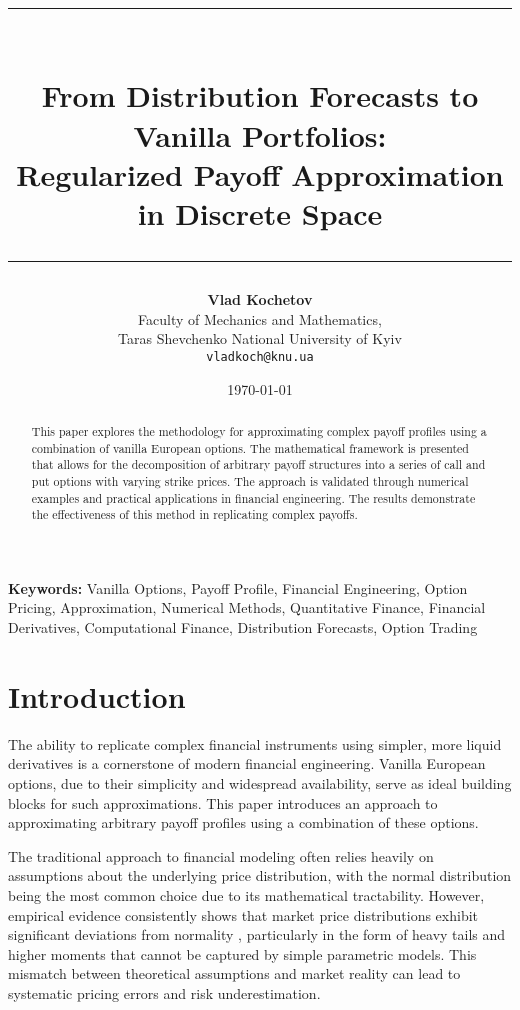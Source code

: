 \documentclass[12pt]{article}
\title{\rule{\textwidth}{4pt}\\[1em]
\textbf{From Distribution Forecasts to Vanilla Portfolios: \\[0.2cm]
Regularized Payoff Approximation in Discrete Space}\\[1em]
\rule{\textwidth}{2pt}}
\author{\small \textbf{Vlad Kochetov} \\
    \small Faculty of Mechanics and Mathematics, \\
    \small Taras Shevchenko National University of Kyiv \\
    \small \texttt{vladkoch@knu.ua}
}
\date{\today}
\providecommand{\keywords}[1]{\textbf{Keywords:} #1}
\begin{document}
\thispagestyle{empty}

\maketitle

\begin{abstract}
This paper explores the methodology for approximating complex payoff profiles using a
combination of vanilla European options. The mathematical framework is presented that
allows for the decomposition of arbitrary payoff structures into a series of call and
put options with varying strike prices. The approach is validated through numerical
examples and practical applications in financial engineering. The results demonstrate
the effectiveness of this method in replicating complex payoffs.
\end{abstract}

\newpage

\keywords{
    \small{
        Vanilla Options, 
        Payoff Profile, 
        Financial Engineering, 
        Option Pricing, 
        Approximation, 
        Numerical Methods,
        Quantitative Finance,
        Financial Derivatives,
        Computational Finance,
        Distribution Forecasts,
        Option Trading
    }
}

\section{Introduction}
The ability to replicate complex financial instruments using simpler, more liquid
derivatives is a cornerstone of modern financial engineering. Vanilla European 
options, due to their simplicity and widespread availability, serve as ideal 
building blocks for such approximations. This paper introduces an approach to 
approximating arbitrary payoff profiles using a combination of these options.

The traditional approach to financial modeling often relies heavily on assumptions about
the underlying price distribution, with the normal distribution being the most common choice
due to its mathematical tractability. However, empirical evidence consistently shows that
market price distributions exhibit significant deviations from normality \citep{Pokharel2024},
particularly in the form of heavy tails and higher moments that cannot be captured by simple
parametric models. This mismatch between theoretical assumptions and market reality can lead to
systematic pricing errors and risk underestimation.
\end{document}
